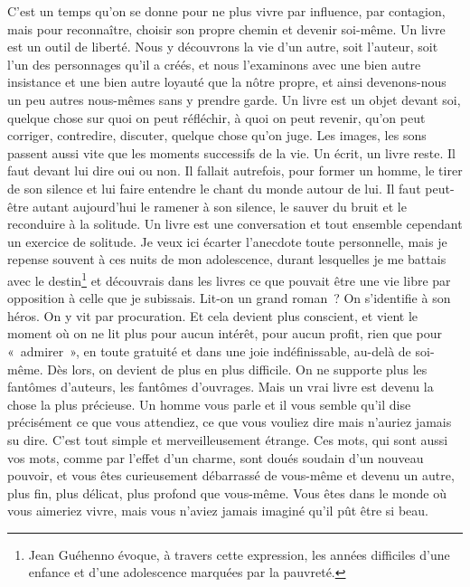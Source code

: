 {C'est un temps qu'on se donne pour ne plus vivre par influence, par
contagion, mais pour reconnaître, choisir son propre chemin et
devenir soi-même. Un livre est un outil de liberté. Nous y découvrons
la vie d'un autre, soit l'auteur, soit l'un des personnages qu'il a
créés, et nous l'examinons avec une bien autre insistance et une bien
autre loyauté que la nôtre propre, et ainsi devenons-nous un peu
autres nous-mêmes sans y prendre garde. Un livre est un objet devant
soi, quelque chose sur quoi on peut réfléchir, à quoi on peut
revenir, qu'on peut corriger, contredire, discuter, quelque chose
qu'on juge. Les images, les sons passent aussi vite que les moments
successifs de la vie. Un écrit, un livre reste. Il faut devant lui
dire oui ou non. Il fallait autrefois, pour former un homme, le tirer
de son silence et lui faire entendre le chant du monde autour de lui.
Il faut peut-être autant aujourd'hui le ramener à son silence, le
sauver du bruit et le reconduire à la solitude. Un livre est une
conversation et tout ensemble cependant un exercice de solitude. Je
veux ici écarter l'anecdote toute personnelle, mais je repense
souvent à ces nuits de mon adolescence, durant lesquelles je me
battais avec le destin\footnote{Jean Guéhenno évoque, à travers cette
expression, les années difficiles d'une enfance et d'une adolescence
marquées par la pauvreté.} et découvrais dans les livres ce que
pouvait être une vie libre par opposition à celle que je subissais.
Lit-on un grand roman~? On s'identifie à son héros. On y vit par
procuration. Et cela devient plus conscient, et vient le moment où on
ne lit plus pour aucun intérêt, pour aucun profit, rien que pour
«~admirer~», en toute gratuité et dans une joie indéfinissable,
au-delà de soi-même. Dès lors, on devient de plus en plus difficile.
On ne supporte plus les fantômes d'auteurs, les fantômes d'ouvrages.
Mais un vrai livre est devenu la chose la plus précieuse. Un homme
vous parle et il vous semble qu'il dise précisément ce que vous
attendiez, ce que vous vouliez dire mais n'auriez jamais su dire.
C'est tout simple et merveilleusement étrange. Ces mots, qui sont
aussi vos mots, comme par l'effet d'un charme, sont doués soudain
d'un nouveau pouvoir, et vous êtes curieusement débarrassé de
vous-même et devenu un autre, plus fin, plus délicat, plus profond
que vous-même. Vous êtes dans le monde où vous aimeriez vivre, mais
vous n'aviez jamais imaginé qu'il pût être si beau.
}

